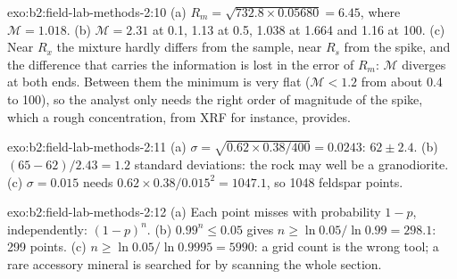 \begin{solution}{exo:b2:field-lab-methods-2:10}
(a) $R_m = \sqrt{732.8 \times 0.05680} = 6.45$, where $\mathcal M = 1.018$. (b) $\mathcal M = 2.31$
at 0.1, 1.13 at 0.5, 1.038 at 1.664 and 1.16 at 100. (c) Near $R_x$ the mixture hardly differs from
the sample, near $R_s$ from the spike, and the difference that carries the information is lost in
the error of $R_m$: $\mathcal M$ diverges at both ends. Between them the minimum is very flat
($\mathcal M < 1.2$ from about 0.4 to 100), so the analyst only needs the right order of magnitude
of the spike, which a rough concentration, from XRF for instance, provides.
\end{solution}

\begin{solution}{exo:b2:field-lab-methods-2:11}
(a) $\sigma = \sqrt{0.62 \times 0.38/400} = 0.0243$: $62 \pm 2.4$. (b) $(65 - 62)/2.43 = 1.2$
standard deviations: the rock may well be a granodiorite. (c) $\sigma = 0.015$ needs $0.62 \times
0.38/0.015^2 = 1047.1$, so 1048 feldspar points.
\end{solution}

\begin{solution}{exo:b2:field-lab-methods-2:12}
(a) Each point misses with probability $1 - p$, independently: $(1-p)^n$. (b) $0.99^n \le 0.05$
gives $n \ge \ln 0.05/\ln 0.99 = 298.1$: 299 points. (c) $n \ge \ln 0.05/\ln 0.9995 = 5990$: a grid
count is the wrong tool; a rare accessory mineral is searched for by scanning the whole section.
\end{solution}

